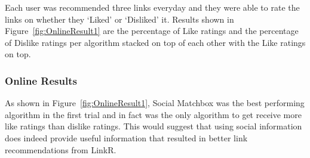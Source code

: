 Each user was recommended three links everyday and they were able to
rate the links on whether they `Liked' or `Disliked' it. Results shown
in Figure~\ref{fig:OnlineResult1} are the percentage of Like ratings
and the percentage of Dislike ratings per algorithm stacked on top of
each other with the Like ratings on top.

\subsubsection{Online Results}

As shown in Figure~\ref{fig:OnlineResult1}, Social Matchbox was the
best performing algorithm in the first trial and in fact was the only
algorithm to get receive more like ratings than dislike ratings. This
would suggest that using social information does indeed provide useful
information that resulted in better link recommendations from LinkR.

